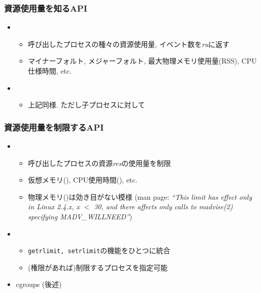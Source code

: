 \documentclass[12pt,dvipdfmx]{beamer}
\begin{document}
\begin{frame}
  \frametitle{資源使用量を知るAPI}
  \begin{itemize}
  \item {}
    \begin{itemize}
    \item 呼び出したプロセスの種々の資源使用量, イベント数を{\it ru}に返す
    \item マイナーフォルト, メジャーフォルト,
      最大物理メモリ使用量(RSS), CPU仕様時間, etc.
    \end{itemize}
  \item {}
    \begin{itemize}
    \item 上記同様. ただし子プロセスに対して
    \end{itemize}
  \end{itemize}
\end{frame}

    
\begin{frame}
  \frametitle{資源使用量を制限するAPI}
  \begin{itemize}
  \item {}
    \begin{itemize}
    \item 呼び出したプロセスの資源{\it res}の使用量を制限
    \item 仮想メモリ(), CPU使用時間(), etc.
    \item 物理メモリ()は効き目がない模様
      (man page: {\it{\scriptsize ``This limit has effect only in Linux 2.4.x, x $<$ 30,
        and there affects only calls to madvise(2) specifying MADV\_WILLNEED''}})
    \end{itemize}
    
  \item {}
    \begin{itemize}
    \item {\tt getrlimit, setrlimit}の機能をひとつに統合
    \item (権限があれば)制限するプロセスを指定可能
    \end{itemize}

  \item cgroups (後述)
  \end{itemize}
\end{frame}
\end{document}
